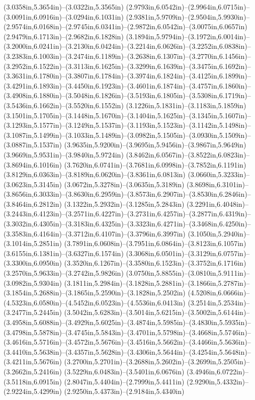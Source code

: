 (3.0358in,5.3654in)--(3.0322in,5.3565in) (2.9793in,6.0542in)--(2.9964in,6.0715in)--(3.0091in,6.0916in)--(3.0294in,6.1031in) (2.9381in,5.9709in)--(2.9504in,5.9930in)--(2.9574in,6.0168in)--(2.9745in,6.0341in)--(2.9872in,6.0542in)--(3.0075in,6.0657in) (2.9479in,6.1713in)--(2.9682in,6.1828in) (3.1894in,5.9794in)--(3.1972in,6.0014in)--(3.2000in,6.0241in)--(3.2130in,6.0424in)--(3.2214in,6.0626in)--(3.2252in,6.0838in)--(3.2383in,6.1003in)--(3.2474in,6.1189in)--(3.2638in,6.1307in)--(3.2770in,6.1456in)--(3.2952in,6.1522in)--(3.3113in,6.1625in)--(3.3299in,6.1639in)--(3.3475in,6.1692in)--(3.3631in,6.1780in)--(3.3807in,6.1784in)--(3.3974in,6.1824in)--(3.4125in,6.1899in)--(3.4291in,6.1893in)--(3.4450in,6.1923in)--(3.4601in,6.1874in)--(3.4757in,6.1860in)--(3.4908in,6.1880in)--(3.5048in,6.1826in)--(3.5193in,6.1805in)--(3.5308in,6.1719in)--(3.5436in,6.1662in)--(3.5520in,6.1552in) (3.1226in,5.1831in)--(3.1183in,5.1859in) (3.1501in,5.1705in)--(3.1448in,5.1670in)--(3.1404in,5.1625in)--(3.1345in,5.1607in)--(3.1293in,5.1577in)--(3.1249in,5.1537in)--(3.1193in,5.1523in)--(3.1142in,5.1498in)--(3.1087in,5.1499in)--(3.1033in,5.1489in)--(3.0982in,5.1505in)--(3.0930in,5.1509in)--(3.0887in,5.1537in) (3.9635in,5.9200in)--(3.9695in,5.9456in)--(3.9867in,5.9649in) (3.9669in,5.9531in)--(3.9840in,5.9724in) (3.8462in,6.0567in)--(3.8522in,6.0823in)--(3.8694in,6.1016in) (3.7620in,6.0741in)--(3.7681in,6.0998in)--(3.7852in,6.1191in) (3.8129in,6.0363in)--(3.8189in,6.0620in)--(3.8361in,6.0813in) (3.0660in,5.3233in)--(3.0623in,5.3145in) (3.0672in,5.3278in)--(3.0635in,5.3189in) (3.8698in,6.3101in)--(3.8656in,6.3033in)--(3.8630in,6.2959in)--(3.8573in,6.2907in)--(3.8530in,6.2846in)--(3.8464in,6.2812in) (3.1322in,5.2932in)--(3.1285in,5.2843in) (3.2291in,6.4048in)--(3.2443in,6.4123in)--(3.2571in,6.4227in)--(3.2731in,6.4257in)--(3.2877in,6.4319in)--(3.3032in,6.4305in)--(3.3183in,6.4325in)--(3.3323in,6.4271in)--(3.3468in,6.4250in)--(3.3583in,6.4164in)--(3.3712in,6.4107in)--(3.3796in,6.3997in) (3.1050in,5.2940in)--(3.1014in,5.2851in) (3.7891in,6.0608in)--(3.7951in,6.0864in)--(3.8123in,6.1057in) (3.6155in,6.1381in)--(3.6327in,6.1574in) (3.3068in,6.0501in)--(3.3129in,6.0757in)--(3.3300in,6.0950in) (3.3520in,6.1267in)--(3.3580in,6.1523in)--(3.3752in,6.1716in) (3.2570in,5.9633in)--(3.2742in,5.9826in) (3.0750in,5.8855in)--(3.0810in,5.9111in)--(3.0982in,5.9304in) (3.1811in,5.2984in)--(3.1828in,5.2881in)--(3.1866in,5.2787in)--(3.1854in,5.2688in)--(3.1865in,5.2590in)--(3.1828in,5.2502in) (4.5208in,6.0666in)--(4.5323in,6.0580in)--(4.5452in,6.0523in)--(4.5536in,6.0413in) (3.2514in,5.2534in)--(3.2477in,5.2445in) (3.5042in,5.6283in)--(3.5014in,5.6215in)--(3.5002in,5.6144in)--(3.4958in,5.6088in)--(3.4929in,5.6025in)--(3.4874in,5.5985in)--(3.4830in,5.5935in)--(3.4798in,5.5878in)--(3.4745in,5.5843in)--(3.4701in,5.5798in)--(3.4668in,5.5746in)--(3.4616in,5.5716in)--(3.4572in,5.5676in)--(3.4516in,5.5662in)--(3.4466in,5.5636in)--(3.4410in,5.5638in)--(3.4357in,5.5628in)--(3.4306in,5.5644in)--(3.4254in,5.5648in)--(3.4211in,5.5676in) (3.2700in,5.2701in)--(3.2688in,5.2602in)--(3.2699in,5.2505in)--(3.2662in,5.2416in) (3.5229in,6.0483in)--(3.5401in,6.0676in) (3.4946in,6.0722in)--(3.5118in,6.0915in) (2.8047in,5.4404in)--(2.7999in,5.4411in) (2.9290in,5.4332in)--(2.9224in,5.4299in) (2.9250in,5.4373in)--(2.9184in,5.4340in) 